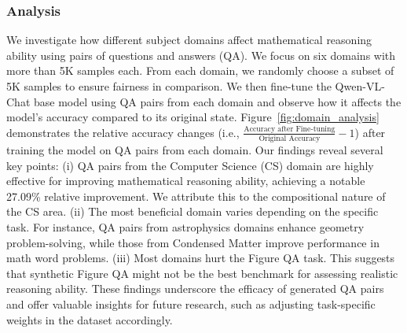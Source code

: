 \subsubsection{Analysis}
We investigate how different subject domains affect mathematical reasoning ability using pairs of questions and answers (QA). We focus on six domains with more than 5K samples each. From each domain, we randomly choose a subset of 5K samples to ensure fairness in comparison. We then fine-tune the Qwen-VL-Chat base model using QA pairs from each domain and observe how it affects the model's accuracy compared to its original state.
Figure~\ref{fig:domain_analysis} demonstrates the relative accuracy changes (i.e., $\frac{\text{Accuracy after Fine-tuning}}{\text{Original Accuracy}} - 1 $) after training the model on QA pairs from each domain. Our findings reveal several key points: (i) QA pairs from the Computer Science (CS) domain are highly effective for improving mathematical reasoning ability, achieving a notable 27.09\% relative improvement. We attribute this to the compositional nature of the CS area. (ii) The most beneficial domain varies depending on the specific task. For instance, QA pairs from astrophysics domains enhance geometry problem-solving, while those from Condensed Matter improve performance in math word problems. (iii) Most domains hurt the Figure QA task. This suggests that synthetic Figure QA might not be the best benchmark for assessing realistic reasoning ability.
These findings underscore the efficacy of generated QA pairs and offer valuable insights for future research, such as adjusting task-specific weights in the dataset accordingly.
